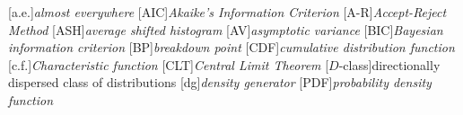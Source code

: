 \usepackage{acronym}
[a.e.]{\textit{almost everywhere}}
[AIC]{\textit{Akaike's Information Criterion}}
[A-R]{\textit{Accept-Reject Method}}
[ASH]{\textit{average shifted histogram}}
[AV]{\textit{asymptotic variance}}
[BIC]{\textit{Bayesian information criterion}}
[BP]{\textit{breakdown point}}
[CDF]{\textit{cumulative distribution function}}
[c.f.]{\textit{Characteristic function}}
[CLT]{\textit{Central Limit Theorem}}
[$D$-class]{directionally dispersed class of distributions}
[dg]{\textit{density generator}}
[PDF]{\textit{probability density function}}
